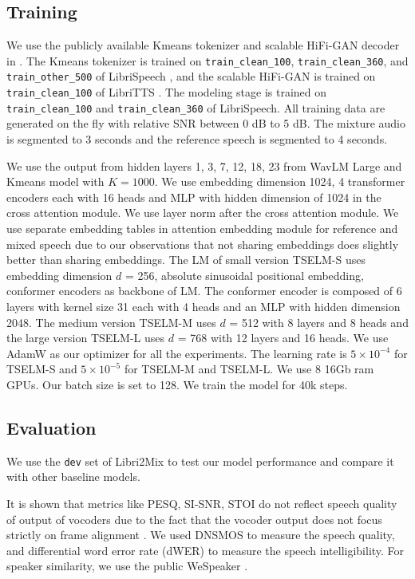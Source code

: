 \documentclass[conference]{IEEEtran}
\begin{document}
\subsection{Training}

We use the publicly available Kmeans tokenizer and scalable 
HiFi-GAN decoder in \cite{speechbrain}. The Kmeans tokenizer
is trained on \texttt{train\_clean\_100}, \texttt{train\_clean\_360}, and \texttt{train\_other\_500} of
LibriSpeech \cite{librispeech}, and the scalable HiFi-GAN is trained on \texttt{train\_clean\_100} of 
LibriTTS \cite{libritts}. The modeling stage is trained on 
\texttt{train\_clean\_100} and \texttt{train\_clean\_360} of LibriSpeech. All training data are 
generated on the fly with relative SNR between 0 dB to 5 dB. The mixture audio is segmented to 3 
seconds and the reference speech is segmented to 4 seconds. 

We use the output from hidden layers 1, 3, 7, 12, 18, 23 from WavLM Large and Kmeans model with 
\(K=1000\).
We use embedding dimension 1024,  4 transformer 
encoders each with 16 heads and MLP with hidden dimension of 1024 in the cross attention module. We 
use layer norm after the cross attention module. 
We use separate embedding tables in attention embedding module for reference and mixed speech due to our observations that not 
sharing embeddings does slightly better than sharing embeddings. The LM of small version TSELM-S uses 
embedding dimension \(d\) = 256, absolute sinusoidal positional embedding, conformer encoders as backbone of LM. The conformer encoder is composed of 
6 layers with kernel size 31 each with 4 heads and an MLP with hidden dimension 2048. The medium version TSELM-M uses \(d\) = 512 with 8 layers and 8 heads and the large version TSELM-L uses 
\(d\) = 768 with 12 layers and 16 heads. We use AdamW as 
our optimizer for all the experiments. The learning rate 
is \(5 \times 10^{-4}\) for TSELM-S and \(5 \times 10^{-5}\) for TSELM-M and TSELM-L. We use 8 16Gb ram GPUs. Our batch size is set to 128. We train the model for 40k steps. 


\subsection{Evaluation}
We use the \texttt{dev} set of Libri2Mix \cite{librimix} to test our model performance and compare it with 
other baseline models. 

It is shown that metrics like PESQ, SI-SNR, STOI do not reflect speech quality of output of 
vocoders due to the fact that the vocoder output does not focus strictly on frame alignment
\cite{tokensplit,selm}. We used DNSMOS \cite{dnsmos} to measure the speech quality, and differential 
word error 
rate (dWER) \cite{dwer} to measure the speech intelligibility. For speaker similarity, we use the 
public WeSpeaker \cite{wespeaker}.
\end{document}
